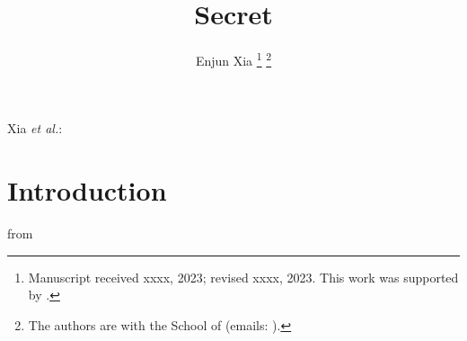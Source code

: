 \documentclass[journal]{IEEEtran}  %
\begin{document}
\title{Secret}

\author{Enjun Xia
\thanks{Manuscript received xxxx, 2023; revised xxxx, 2023. This work was supported by . }%
\thanks{The authors are with the School of (emails: ).}
}

%
{Xia \MakeLowercase{\textit{et al.}}: }


\maketitle

\begin{abstract}

\end{abstract}

\begin{IEEEkeywords}

\end{IEEEkeywords}

\section{Introduction}
 from





\end{document}
